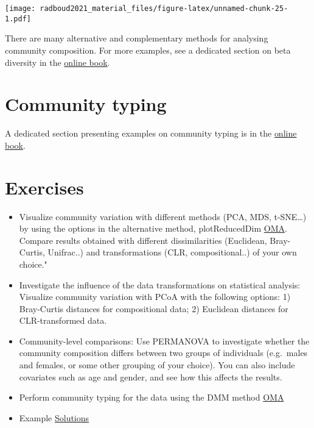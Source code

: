 \documentclass[
]{book}
\begin{document}
\texttt{[image: radboud2021\_material\_files/figure-latex/unnamed-chunk-25-1.pdf]}

There are many alternative and complementary methods for analysing
community composition. For more examples, see a dedicated section on
beta diversity in the \href{https://microbiome.github.io/OMA/microbiome-diversity.html\#beta-diversity}{online
book}.

\hypertarget{community-typing}{%
\section{Community typing}\label{community-typing}}

A dedicated section presenting examples on community typing is in the
\href{https://microbiome.github.io/OMA/microbiome-community.html\#community-typing}{online book}.

\hypertarget{exercises-1}{%
\section{Exercises}\label{exercises-1}}

\begin{itemize}
\item
  Visualize community variation with different methods (PCA, MDS, t-SNE\ldots) by using the options in the alternative method, plotReducedDim \href{https://microbiome.github.io/OMA/microbiome-diversity.html\#estimating-beta-diversity}{OMA}. Compare results obtained with different dissimilarities (Euclidean, Bray-Curtis, Unifrac..) and transformations (CLR, compositional..) of your own choice."
\item
  Investigate the influence of the data transformations on
  statistical analysis: Visualize community variation with PCoA with
  the following options: 1) Bray-Curtis distances for compositional
  data; 2) Euclidean distances for CLR-transformed data.
\item
  Community-level comparisons: Use PERMANOVA to investigate whether
  the community composition differs between two groups of individuals
  (e.g.~males and females, or some other grouping of your
  choice). You can also include covariates such as age and gender,
  and see how this affects the results.
\item
  Perform community typing for the data using the DMM method \href{https://microbiome.github.io/OMA/microbiome-community.html\#community-typing}{OMA}
\item
  Example \href{08-5-ex-sol-ADHD.html}{Solutions}
\end{itemize}
\end{document}
